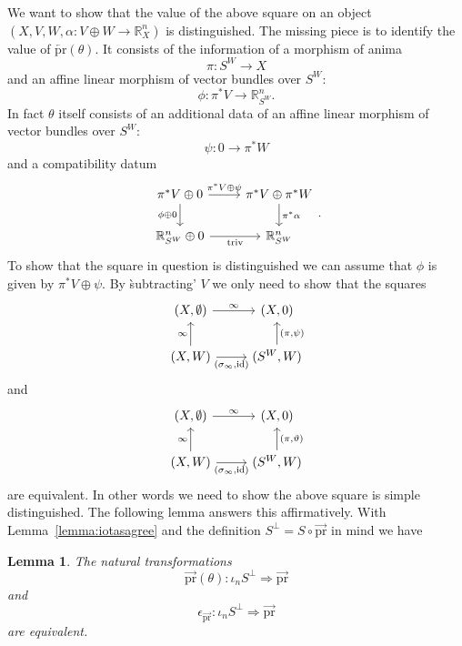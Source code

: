 \documentclass{article}
\newcommand{\R}{\mathbb{R}} %
\newcommand{\pr}{\mathrm{pr}}
\newcommand{\id}{\mathrm{id}}
\newtheorem{lemma}{Lemma}
\begin{document}
We want to show that the value of the above square on an object $(X,V,W,\alpha \colon V \oplus W \to \R^n_X)$ is distinguished.
The missing piece is to identify the value of $\overleftarrow{\pr}(\theta)$.
It consists of the information of a morphism of anima 
\[
\pi \colon S^W \to X    
\]
and an affine linear morphism of vector bundles over $S^W$:
\[
\phi \colon \pi^*V \to \R^n_{S^W}.    
\]
In fact $\theta$ itself consists of an additional data of 
an affine linear morphism of vector bundles over $S^W$:
\[
\psi \colon 0 \to \pi^*W
\]
and a compatibility datum 
\[\begin{tikzcd}
	{\pi^*V \oplus 0} & {\pi^*V \oplus \pi^*W} \\
	{\R^n_{S^W} \oplus 0} & {\R^n_{S^W}}
	\arrow["{\pi^*V \oplus \psi}", from=1-1, to=1-2]
	\arrow["{\pi^*\alpha}", from=1-2, to=2-2]
	\arrow["{\mathrm{triv}}"', from=2-1, to=2-2]
	\arrow["{\phi\oplus 0}"', from=1-1, to=2-1]
\end{tikzcd}.\]
To show that the square in question is distinguished we
can assume that $\phi$ is given by $\pi^*V \oplus \psi$.
By \`subtracting' $V$ we only need to show that the squares 
\[\begin{tikzcd}
	{(X,\emptyset)} & {(X,0)} \\
	{(X,W)} & {(S^W,W)}
	\arrow["\infty", from=1-1, to=1-2]
	\arrow["{(\sigma_\infty,\id)}"', from=2-1, to=2-2]
	\arrow["\infty", from=2-1, to=1-1]
	\arrow["{(\pi,\psi)}"', from=2-2, to=1-2]
\end{tikzcd}\]
and 
\[\begin{tikzcd}
	{(X,\emptyset)} & {(X,0)} \\
	{(X,W)} & {(S^W,W)}
	\arrow["\infty", from=1-1, to=1-2]
	\arrow["{(\sigma_\infty,\id)}"', from=2-1, to=2-2]
	\arrow["\infty", from=2-1, to=1-1]
	\arrow["{(\pi,\vartheta)}"', from=2-2, to=1-2]
\end{tikzcd}\]
are equivalent. In other words we need to show
the above square is simple distinguished. 
The following lemma answers this affirmatively.
With Lemma~\ref{lemma:iotasagree} and the definition $S^\perp = S\circ \overrightarrow{\pr}$ in mind we have 
\begin{lemma}
    The natural transformations 
    \[
    \overrightarrow{\pr}(\theta)   \colon \iota_n S^\perp \Rightarrow \overrightarrow{\pr} 
    \]
    and 
    \[
    \epsilon_{\overrightarrow{\pr}} \colon \iota_n S^\perp \Rightarrow \overrightarrow{\pr} 
    \]
    are equivalent.
\end{lemma}
\end{document}
